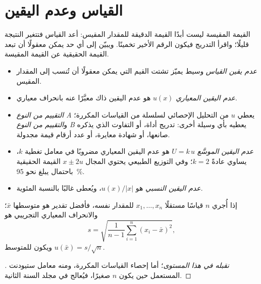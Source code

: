 \section{القياس وعدم اليقين}

القيمة المقيسة ليست أبدًا القيمة الدقيقة للمقدار المقيس: أعد
القياس فتتغير النتيجة قليلًا؛ واقرأ التدريج فيكون
الرقم الأخير تخمينًا. ويبيّن  إلى أي حد يمكن معقولًا أن تبعد
القيمة الحقيقية عن القيمة المقيسة.

\begin{definition}\label{def:b1:lab-techniques-1:uncertainty}
\begin{itemize}
  \item \emph{عدم يقين القياس}
        وسيط يميّز تشتت القيم
        التي يمكن معقولًا أن تُنسب إلى المقدار المقيس.
  \item \emph{عدم اليقين المعياري} $u(x)$
        هو عدم اليقين ذاك معبَّرًا عنه بانحراف معياري.
  \item \emph{التقييم من النوع A} يعطي $u$ من
        التحليل الإحصائي لسلسلة من القياسات المكررة؛
        و\emph{التقييم من النوع B} يعطيه بأي
        وسيلة أخرى: تدريج أداة، أو التفاوت الذي يذكره
        صانعها، أو شهادة معايرة، أو عدد أرقام
        قيمة مجدولة.
  \item \emph{عدم اليقين الموسَّع}
        $U = k\,u$ هو عدم اليقين المعياري مضروبًا في معامل
        تغطية $k$، يساوي عادةً $k = 2$؛ وفي التوزيع الطبيعي يحتوي
        المجال $x \pm 2u$ القيمة الحقيقية باحتمال يبلغ
        نحو \qty{95}{\percent}.
  \item \emph{عدم اليقين النسبي} هو
        $u(x)/|x|$، ويُعطى غالبًا بالنسبة المئوية.
\end{itemize}
\end{definition}

\begin{proposition}\label{prop:b1:lab-techniques-1:type-a}
إذا أُجري $n$ قياسًا مستقلًا $x_1, \dots, x_n$ للمقدار نفسه،
فأفضل تقدير هو متوسطها $\bar x$؛ والانحراف المعياري
التجريبي هو
\[
  s = \sqrt{\frac{1}{n-1} \sum_{i=1}^{n} (x_i - \bar x)^2},
\]
ويكون  للمتوسط $u(\bar x) = s/\sqrt{n}$.
\end{proposition}
\begin{proof}[\omnameProof]
\emph{نقبله في هذا المستوى}؛ أما إحصاء القياسات المكررة،
ومنه معامل ستيودنت المستعمل حين يكون $n$ صغيرًا، فيُعالج في
مجلد السنة الثانية.
\end{proof}


